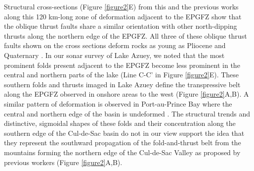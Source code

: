 \documentclass{nature}
\begin{document}
Structural cross-sections (Figure \ref{figure2}E) from this and the previous works \citep{massoni1955haiti,douilly2015three} along this 120 km-long zone of deformation adjacent to the EPGFZ show that the oblique thrust faults share a similar orientation with other north-dipping thrusts along the northern edge of the EPGFZ. All three of these oblique thrust faults shown on the cross sections deform rocks as young as Pliocene and Quaternary \citep{saint2015seismotectonics}. In our sonar survey of Lake Azuey, we noted that the most prominent folds present adjacent to the EPGFZ become less prominent in the central and northern parts of the lake (Line C-C' in Figure \ref{figure2}E). These southern folds and thrusts imaged in Lake Azuey define the transpressive belt along the EPGFZ observed in onshore areas to the west (Figure \ref{figure2}A,B). A similar pattern of deformation is observed in Port-au-Prince Bay where the central and northern edge of the basin is undeformed \citep{massoni1955haiti,mchugh2011offshore,saint2015seismotectonics}. The structural trends and distinctive, sigmoidal shapes of these folds and their concentration along the southern edge of the Cul-de-Sac basin do not in our view support the idea that they represent the southward propagation of the fold-and-thrust belt from the mountains forming the northern edge of the Cul-de-Sac Valley as proposed by previous workers \citep{calais2010transpressional} (Figure \ref{figure2}A,B). 
%
\end{document}
